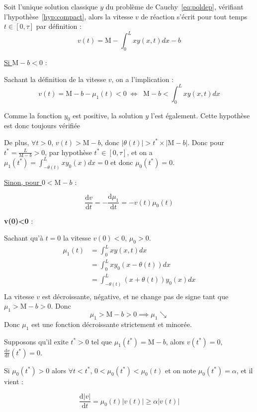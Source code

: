 \documentclass[a4paper]{article}
\newcommand{\mass}{\mathrm{M}}
\newcommand{\dep}{b}
\begin{document}
\begin{preuve}
	Soit l'unique solution classique $y$ du problème de Cauchy~\eqref{eq:poldep}, 
	vérifiant l'hypothèse~\eqref{hyp:compact},
	alors la vitesse $v$ de réaction s'écrit pour tout temps $t \in [0,\tau]$ par définition :
	\[v(t) = \mass -\int_0^L x y(x,t)dx -\dep\]

	\vspace{0.5cm}
	\underline{Si $\mass-\dep < 0 $} :
	
 	Sachant la définition de la vitesse $v$, on a l'implication :
 	\[ v(t) = \mass -\dep - \mu_1(t) <0 \; \iff \; \; \mass-\dep < \int_0^L x y(x,t)dx  \]
	
	Comme la fonction $y_0$ est positive, la solution $y$ l'est également.
	Cette hypothèse est donc toujours vérifiée
	
	De plus, $\forall t>0$, $v(t)> \mass-\dep$, donc $|\theta (t)|> t^*\times
	|\mass-\dep|$.
	Donc pour $t^* = \frac{L}{\mass-\dep}>0$, par hypothèse $t^* \in [0,\tau]$, et on a $ \mu_1(t^*) = \int_{-\theta(t)}^L xy_0(x)dx = 0$ et donc $\mu_0(t^*) =0$.
	
	
	\vspace{0.5cm}
	\underline{Sinon, pour $0<\mass-\dep$} :
	
	\[ \frac{\mathrm{d} v }{\mathrm{d}t} =  - \frac{\mathrm{d} \mu_1 }{\mathrm{d}t} = - v(t) \mu_0(t) \]
	
	\textbf{v(0)<0} :
	
	Sachant qu'à $t=0$ la vitesse $v(0)<0$, $\mu_0 >0$.
	\[ 
	\begin{split}
		\mu_1(t) & = \int_0^L x y(x,t)dx \\
		      & = \int_0^L x y_0(x-\theta(t)) dx \\
		      & = \int_{-\theta(t)}^{L} (x+\theta(t)) y_0(x) dx \\
	\end{split}
	\]
	La vitesse $v$ est décroissante, négative, et  ne change pas de signe tant que $\mu_1 > \mass- \dep >0$. 
	Donc
	\[ \mu_1 > \mass- \dep >0 \implies \mu_1 \searrow \]
    Donc $\mu_1$ est une fonction décroissante strictement et minorée.
	
	Supposons qu'il exite $t^*>0$ tel que $\mu_1(t^*)= \mass -\dep $, 
	alors $v(t^*)=0$, $\frac{\mathrm{d} v }{\mathrm{d}t} (t^*)= 0$.
	
	Si $\mu_0(t^*)>0$ alors $\forall t<t^*$, $0<\mu_0(t^*)<\mu_0(t)$ et on note $ \mu_0(t^*)= \alpha$, et il vient :
	
	\[ \frac{\mathrm{d} |v| }{\mathrm{d}t} = \mu_0(t)|v(t)| \geq \alpha |v(t)| \]
	

\end{preuve}
\end{document}
